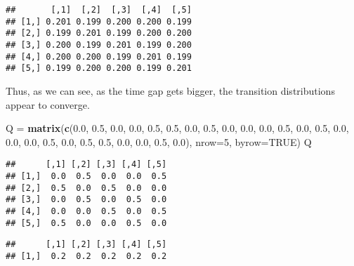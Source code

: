 \documentclass[]{book}
\newenvironment{Shaded}{\begin{snugshade}}{\end{snugshade}}
\newcommand{\DataTypeTok}[1]{\textcolor[rgb]{0.13,0.29,0.53}{#1}}
\newcommand{\DecValTok}[1]{\textcolor[rgb]{0.00,0.00,0.81}{#1}}
\newcommand{\FloatTok}[1]{\textcolor[rgb]{0.00,0.00,0.81}{#1}}
\newcommand{\KeywordTok}[1]{\textcolor[rgb]{0.13,0.29,0.53}{\textbf{#1}}}
\newcommand{\NormalTok}[1]{#1}
\newcommand{\OperatorTok}[1]{\textcolor[rgb]{0.81,0.36,0.00}{\textbf{#1}}}
\newcommand{\OtherTok}[1]{\textcolor[rgb]{0.56,0.35,0.01}{#1}}
\newcommand{\StringTok}[1]{\textcolor[rgb]{0.31,0.60,0.02}{#1}}
\begin{document}
\begin{verbatim}
##       [,1]  [,2]  [,3]  [,4]  [,5]
## [1,] 0.201 0.199 0.200 0.200 0.199
## [2,] 0.199 0.201 0.199 0.200 0.200
## [3,] 0.200 0.199 0.201 0.199 0.200
## [4,] 0.200 0.200 0.199 0.201 0.199
## [5,] 0.199 0.200 0.200 0.199 0.201
\end{verbatim}

Thus, as we can see, as the time gap gets bigger, the transition distributions appear to converge.

\begin{Shaded}
\begin{Highlighting}[]
\NormalTok{Q =}\StringTok{ }\KeywordTok{matrix}\NormalTok{(}\KeywordTok{c}\NormalTok{(}\FloatTok{0.0}\NormalTok{, }\FloatTok{0.5}\NormalTok{, }\FloatTok{0.0}\NormalTok{, }\FloatTok{0.0}\NormalTok{, }\FloatTok{0.5}\NormalTok{,}
             \FloatTok{0.5}\NormalTok{, }\FloatTok{0.0}\NormalTok{, }\FloatTok{0.5}\NormalTok{, }\FloatTok{0.0}\NormalTok{, }\FloatTok{0.0}\NormalTok{,}
             \FloatTok{0.0}\NormalTok{, }\FloatTok{0.5}\NormalTok{, }\FloatTok{0.0}\NormalTok{, }\FloatTok{0.5}\NormalTok{, }\FloatTok{0.0}\NormalTok{,}
             \FloatTok{0.0}\NormalTok{, }\FloatTok{0.0}\NormalTok{, }\FloatTok{0.5}\NormalTok{, }\FloatTok{0.0}\NormalTok{, }\FloatTok{0.5}\NormalTok{,}
             \FloatTok{0.5}\NormalTok{, }\FloatTok{0.0}\NormalTok{, }\FloatTok{0.0}\NormalTok{, }\FloatTok{0.5}\NormalTok{, }\FloatTok{0.0}\NormalTok{), }
           \DataTypeTok{nrow=}\DecValTok{5}\NormalTok{, }\DataTypeTok{byrow=}\OtherTok{TRUE}\NormalTok{)}
\NormalTok{Q}
\end{Highlighting}
\end{Shaded}

\begin{verbatim}
##      [,1] [,2] [,3] [,4] [,5]
## [1,]  0.0  0.5  0.0  0.0  0.5
## [2,]  0.5  0.0  0.5  0.0  0.0
## [3,]  0.0  0.5  0.0  0.5  0.0
## [4,]  0.0  0.0  0.5  0.0  0.5
## [5,]  0.5  0.0  0.0  0.5  0.0
\end{verbatim}

\begin{Shaded}
\end{Shaded}

\begin{verbatim}
##      [,1] [,2] [,3] [,4] [,5]
## [1,]  0.2  0.2  0.2  0.2  0.2
\end{verbatim}
\end{document}
